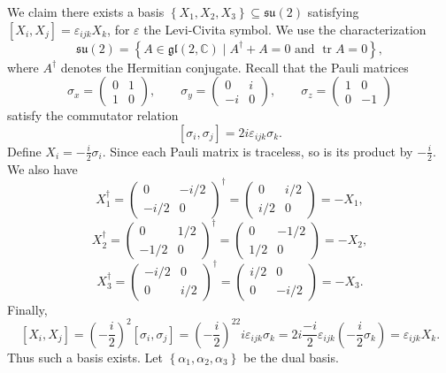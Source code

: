 \documentclass[11pt, letterpaper]{article}
\theoremstyle{plain}
\begin{document}
We claim there exists a basis $\left\{ X_1,X_2,X_3 \right\} \subseteq \mathfrak{su} (2)$ satisfying $[X_i,X_j]=\varepsilon _{ijk}X_k$, for $\varepsilon $ the Levi-Civita symbol. We use the characterization
\[
	\mathfrak{su} (2)=\left\{ A\in \mathfrak{gl}(2,\mathbb{C} )\mid A^\dagger +A=0\text{ and } \operatorname{tr} A=0 \right\} ,
\]
where $A^\dagger $ denotes the Hermitian conjugate. Recall that the Pauli matrices
\[
	\sigma _x = \begin{pmatrix}
	0 & 1 \\
	1 & 0
	\end{pmatrix},\qquad \sigma _y = \begin{pmatrix}
	0 & i \\
	-i & 0
	\end{pmatrix},\qquad \sigma _z = \begin{pmatrix}
	1 & 0 \\
	0 & -1
	\end{pmatrix}
\]
satisfy the commutator relation
\[
	[\sigma _i,\sigma _j]=2i\varepsilon _{ijk} \sigma _k
.\]
Define $X_i = -\frac{i}{2} \sigma _i$. Since each Pauli matrix is traceless, so is its product by $-\frac{i}{2} $. We also have
\[
	X_1^\dagger =\begin{pmatrix}
	0 & -i/2 \\
	-i/2 & 0
	\end{pmatrix}^\dagger =\begin{pmatrix}
	0 & i/2 \\
	i/2 & 0
	\end{pmatrix}=-X_1,
\]
\[
	X_2^\dagger =\begin{pmatrix}
	0 & 1/2 \\
	-1/2 & 0
	\end{pmatrix}^\dagger =\begin{pmatrix}
	0 & -1/2 \\
	1/2 & 0
	\end{pmatrix}=-X_2,
\]
\[
	X_3^\dagger =\begin{pmatrix}
	-i/2 & 0 \\
	0 & i/2
	\end{pmatrix}^\dagger =\begin{pmatrix}
	i/2 & 0 \\
	0 & -i/2
	\end{pmatrix}=-X_3
.\]
Finally,
\[
	[X_i,X_j]=\left( -\frac{i}{2}  \right) ^2[\sigma _i,\sigma _j]=\left( -\frac{i}{2}  \right) ^22i\varepsilon _{ijk} \sigma _k=2i\frac{-i}{2} \varepsilon _{ijk} \left( -\frac{i}{2} \sigma _k \right) =\varepsilon _{ijk} X_k
.\]
Thus such a basis exists. Let $\left\{ \alpha _1,\alpha _2,\alpha _3 \right\} $ be the dual basis.
\end{document}
